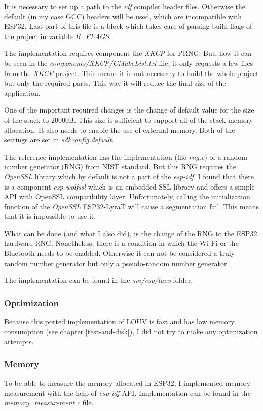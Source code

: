 \documentclass[thesis=M,english]{FITthesis}[2019/12/23]
\begin{document}
\noindent
It is necessary to set up a path to the \textit{idf} compiler header files. Otherwise the default (in my case GCC) headers will be used, which are incompatible with ESP32.
Last part of this file is a block which takes care of parsing build flags of the project in variable \textit{B\_FLAGS}.

\bigskip
\noindent
The implementation requires component the \textit{XKCP} for PRNG. But, how it can be seen in the \textit{components/XKCP/CMakeList.txt} file, it only requests a few files from the \textit{XKCP} project. This means it is not necessary to build the whole project but only the required parts. This way it will reduce the final size of the application.

\bigskip
\noindent
One of the important required changes is the change of default value for the size of the stack to 20000B. This size is sufficient to support all of the stack memory allocation. It also needs to enable the use of external memory. Both of the settings are set in \textit{sdkconfig.default}.

\bigskip
\noindent
The reference implementation has the implementation (file \textit{rng.c}) of a random number generator (RNG) from NIST standard. But this RNG requires the \textit{OpenSSL} library which by default is not a part of the \textit{esp-idf}. I found that there is a component \textit{esp-wolfssl} which is an embedded SSL library and offers a simple API with OpenSSL compatibility layer. Unfortunately, calling the initialization function of the \textit{OpenSSL} ESP32-LyraT will cause a segmentation fail. This means that it is impossible to use it. 

\bigskip
\noindent
What can be done (and what I also did), is the change of the RNG to the ESP32 hardware RNG. Nonetheless, there is a condition in which the Wi-Fi or the Bluetooth needs to be enabled. Otherwise it can not be considered a truly random number generator but only a pseudo-random number generator.

\bigskip
\noindent
The implementation can be found in the \textit{src/esp/luov} folder.

\subsubsection{Optimization}
Because this ported implementation of LOUV is fast and has low memory consumption (see chapter \ref{test-and-disk}), I did not try to make any optimization attempts.

\subsubsection{Memory} \label{esp-luov-memory}
To be able to measure the memory allocated in ESP32, I implemented memory measurement with the help of \textit{esp-idf} API. Implementation can be found in the \textit{memory\_measurement.c} file.
\end{document}
